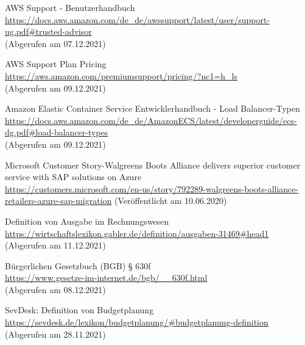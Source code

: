 \begin{thebibliography}{HR08}
    AWS Support - Benutzerhandbuch\\
  \url{https://docs.aws.amazon.com/de_de/awssupport/latest/user/support-ug.pdf#trusted-advisor}\\
  (Abgerufen am 07.12.2021)

   AWS Support Plan Pricing\\
  \url{https://aws.amazon.com/premiumsupport/pricing/?nc1=h_ls}\\
  (Abgerufen am 09.12.2021)

    Amazon Elastic Container Service Entwicklerhandbuch - Load Balancer-Typen\\
  \url{https://docs.aws.amazon.com/de_de/AmazonECS/latest/developerguide/ecs-dg.pdf#load-balancer-types}\\
  (Abgerufen am 09.12.2021)

   Microsoft Customer Story-Walgreens Boots Alliance delivers superior customer service with SAP solutions on Azure \\
  \url{https://customers.microsoft.com/en-us/story/792289-walgreens-boots-alliance-retailers-azure-sap-migration}
  (Veröffentlicht am 10.06.2020)
 
   Definition von Ausgabe im Rechnungswesen\\
  \url{https://wirtschaftslexikon.gabler.de/definition/ausgaben-31469#head1}
  (Abgerufen am 11.12.2021)


   Bürgerlichen Gesetzbuch (BGB) § 630f\\
  \url{https://www.gesetze-im-internet.de/bgb/__630f.html}\\
  (Abgerufen am 08.12.2021)

  SevDesk: Definition von Budgetplanung\\
  \url{https://sevdesk.de/lexikon/budgetplanung/#budgetplanung-definition}\\
  (Abgerufen am 28.11.2021)


\end{thebibliography}
